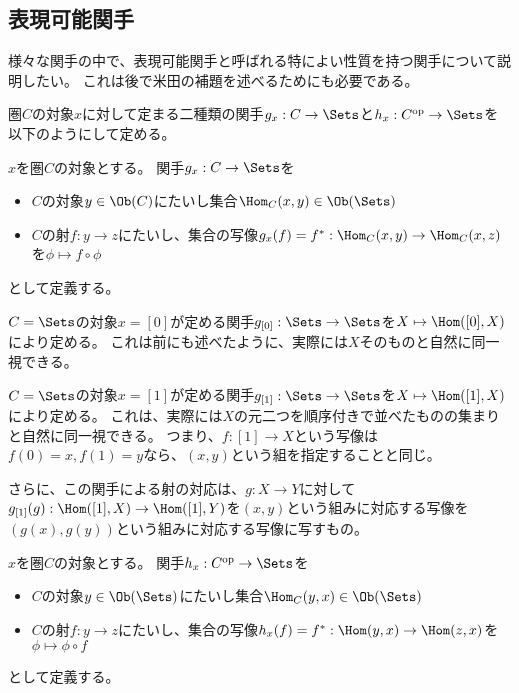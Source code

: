 \documentclass[uplatex]{jsarticle}
\begin{document}
\subsection{表現可能関手}
様々な関手の中で、表現可能関手と呼ばれる特によい性質を持つ関手について説明したい。
これは後で米田の補題を述べるためにも必要である。

圏$C$の対象$x$に対して定まる二種類の関手$g_x:C \to \Sets$と$h_x:C^{\rm op} \to \Sets$を以下のようにして定める。

\begin{dfn}
$x$を圏$C$の対象とする。
関手$g_x:C\to \Sets$を
\begin{itemize}
\item $C$の対象$y\in\Ob(C)$にたいし集合$\Hom_C(x,y)\in\Ob(\Sets)$
\item $C$の射$f:y\to z$にたいし、集合の写像$g_x(f)=f^*:\Hom_C(x,y)\to\Hom_C(x,z)$を$\phi\mapsto f\circ\phi$
\end{itemize}
として定義する。
\end{dfn}

\begin{eg}
$C=\Sets$の対象$x=[0]$が定める関手$g_{[0]}:\Sets \to \Sets$を$X \mapsto \Hom([0], X)$により定める。
これは前にも述べたように、実際には$X$そのものと自然に同一視できる。
\end{eg}

\begin{eg}
$C=\Sets$の対象$x=[1]$が定める関手$g_{[1]}:\Sets \to \Sets$を$X \mapsto \Hom([1], X)$により定める。
これは、実際には$X$の元二つを順序付きで並べたものの集まりと自然に同一視できる。
つまり、$f:[1] \to X$という写像は$f(0)=x, f(1)=y$なら、$(x,y)$という組を指定することと同じ。

さらに、この関手による射の対応は、$g:X \to Y$に対して$g_{[1]}(g):\Hom([1], X) \to \Hom([1], Y)$を$(x,y)$という組みに対応する写像を$(g(x), g(y))$という組みに対応する写像に写すもの。
\end{eg}

\begin{dfn}
$x$を圏$C$の対象とする。
関手$h_x:C^{\rm op}\to \Sets$を
\begin{itemize}
\item $C$の対象$y\in\Ob(\Sets)$にたいし集合$\Hom_C(y,x)\in\Ob(\Sets)$
\item $C$の射$f:y\to z$にたいし、集合の写像$h_x(f)=f^*:\Hom(y,x)\to\Hom(z,x)$を$\phi\mapsto \phi\circ f$
\end{itemize}
として定義する。
\end{dfn}
\end{document}
